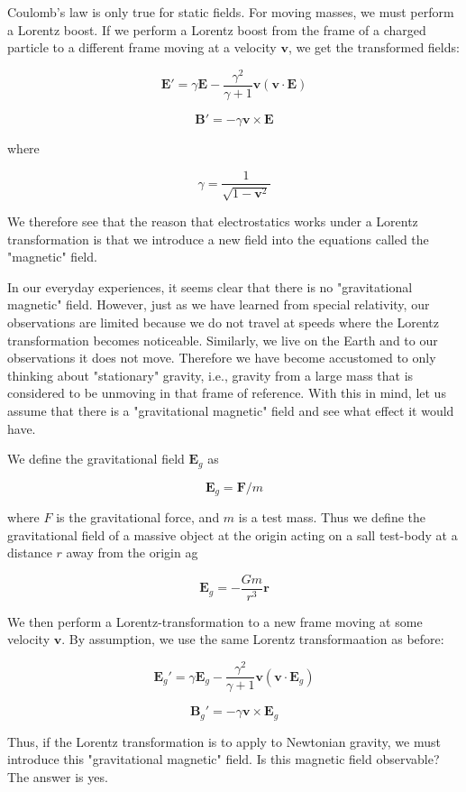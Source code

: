 \documentclass {article}
\renewcommand\vec{\mathbf}
\begin{document}
Coulomb's law is only true for static fields. For moving masses, we must perform a Lorentz boost. If we perform a  Lorentz boost from the frame of a charged particle to a different frame moving at a velocity $\vec v$, we get the transformed fields:

$$\vec E' = \gamma \vec E - \frac {\gamma^2} {\gamma + 1} \vec v (\vec v \cdot \vec E) $$

$$ \vec B' = - \gamma \vec v \times \vec E$$

where 

$$ \gamma = \frac 1 {\sqrt{1 - \vec v^ 2} } $$ 

We therefore see that the reason that electrostatics works under a Lorentz transformation is that we introduce a new field into the equations called the "magnetic" field.

In our everyday experiences, it seems clear that there is no "gravitational magnetic" field. However, just as we have learned from special relativity, our observations are limited because we do not travel at speeds where the Lorentz transformation becomes noticeable. Similarly, we live on the Earth and to our observations it does not move. Therefore we have become accustomed to only thinking about "stationary" gravity, i.e., gravity from a large mass that is considered to be unmoving in that frame of reference. With this in mind, let us assume that there is a "gravitational magnetic" field and see what effect it would have.

We define the gravitational field $\vec E_g $ as

$$ \vec E_g = \vec F / m $$

where $F$ is the gravitational force, and $m$ is a test mass. Thus we define the gravitational field of a massive object at the origin acting on a sall test-body at a distance $r$ away from the origin ag

$$\vec E_g = - \frac {Gm} {r^3} \vec r $$

We then perform a Lorentz-transformation to a new frame moving at some velocity $\vec v$. By assumption, we use the same Lorentz transformaation as before:

$$\vec E_g' = \gamma \vec E_g - \frac {\gamma^2} {\gamma + 1} \vec v (\vec v \cdot \vec E_g) $$

$$ \vec B_g' = - \gamma \vec v \times \vec E_g$$

Thus, if the Lorentz transformation is to apply to Newtonian gravity, we must introduce this "gravitational magnetic" field. Is this magnetic field observable? The answer is yes.
\end{document}
